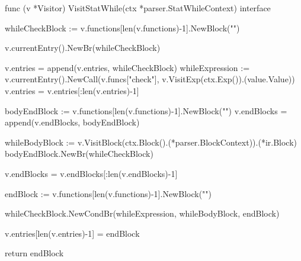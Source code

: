 func (v *Visitor) VisitStatWhile(ctx *parser.StatWhileContext) interface{} {
	whileCheckBlock := v.functions[len(v.functions)-1].NewBlock("")

	v.currentEntry().NewBr(whileCheckBlock)

	v.entries = append(v.entries, whileCheckBlock)
	whileExpression := v.currentEntry().NewCall(v.funcs["check"], v.VisitExp(ctx.Exp()).(value.Value))
	v.entries = v.entries[:len(v.entries)-1]

	bodyEndBlock := v.functions[len(v.functions)-1].NewBlock("")
	v.endBlocks = append(v.endBlocks, bodyEndBlock)

	whileBodyBlock := v.VisitBlock(ctx.Block().(*parser.BlockContext)).(*ir.Block)
	bodyEndBlock.NewBr(whileCheckBlock)

	v.endBlocks = v.endBlocks[:len(v.endBlocks)-1]

	endBlock := v.functions[len(v.functions)-1].NewBlock("")

	whileCheckBlock.NewCondBr(whileExpression, whileBodyBlock, endBlock)

	v.entries[len(v.entries)-1] = endBlock

	return endBlock
}